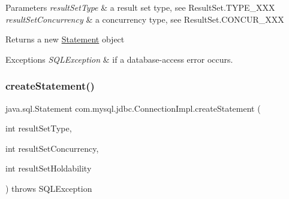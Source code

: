 \begin{DoxyParams}{Parameters}
{\em result\+Set\+Type} & a result set type, see Result\+Set.\+T\+Y\+P\+E\+\_\+\+X\+XX \\
\hline
{\em result\+Set\+Concurrency} & a concurrency type, see Result\+Set.\+C\+O\+N\+C\+U\+R\+\_\+\+X\+XX \\
\hline
\end{DoxyParams}
\begin{DoxyReturn}{Returns}
a new \mbox{\hyperlink{interfacecom_1_1mysql_1_1jdbc_1_1_statement}{Statement}} object 
\end{DoxyReturn}

\begin{DoxyExceptions}{Exceptions}
{\em S\+Q\+L\+Exception} & if a database-\/access error occurs. \\
\hline
\end{DoxyExceptions}
\mbox{\label{classcom_1_1mysql_1_1jdbc_1_1_connection_impl_abcace91f81040aecda4bb5b0528a4228}} 
\subsubsection{\texorpdfstring{create\+Statement()}{createStatement()}\hspace{0.1cm}{\footnotesize\ttfamily [3/3]}}
{\footnotesize\ttfamily java.\+sql.\+Statement com.\+mysql.\+jdbc.\+Connection\+Impl.\+create\+Statement (\begin{DoxyParamCaption}\item[{int}]{result\+Set\+Type,  }\item[{int}]{result\+Set\+Concurrency,  }\item[{int}]{result\+Set\+Holdability }\end{DoxyParamCaption}) throws S\+Q\+L\+Exception}

